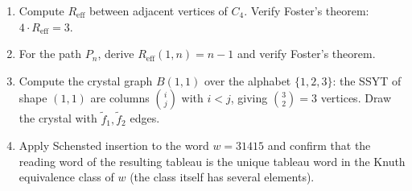 \begin{enumerate}
\item Compute $R_{\mathrm{eff}}$ between adjacent vertices of $C_4$. Verify
Foster's theorem: $4 \cdot R_{\mathrm{eff}} = 3$.

\item For the path $P_n$, derive $R_{\mathrm{eff}}(1, n) = n - 1$ and verify
Foster's theorem.

\item Compute the crystal graph $B(1, 1)$ over the alphabet $\{1, 2, 3\}$:
the SSYT of shape $(1, 1)$ are columns $\binom{i}{j}$ with $i < j$,
giving $\binom{3}{2} = 3$ vertices. Draw the crystal with
$\widetilde f_1, \widetilde f_2$ edges.

\item Apply Schensted insertion to the word $w = 3 1 4 1 5$ and confirm that
the reading word of the resulting tableau is the unique tableau word
in the Knuth equivalence class of $w$ (the class itself has several
elements).
\end{enumerate}

